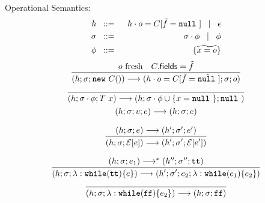 \documentclass[a4paper]{llncs}
\newcommand{\nul}{\ensuremath{\mathtt{null}\ }}
\newcommand{\vdecl}[2]{#1\ #2}
\newcommand{\newo}[1]{\ensuremath{\mathtt{new}\ #1()}}
\newcommand{\while}[2]{\ensuremath{\mathtt{while}(#1)\set{#2}}}
\newcommand{\econtext}[2]{\mathcal{#1}[#2]}
\begin{document}
%
	Operational Semantics:
%
	\begin{eqnarray*}
		h &\bnfis& h \cat o = C[\vect{f} = \vec{\nul}] \bnfbar \epsilon\\
		\sigma &\bnfis& \sigma \cat \phi \bnfbar \phi\\
		\phi &\bnfis& \set{\widetilde{x = o}}
	\end{eqnarray*}
%
\[
	\begin{array}{c}
		\tree{
			o\ \textrm{fresh} \quad C.\mathsf{fields} = \vect{f}
		}{
			(h; \sigma; \newo{C}) \red (h \cat o = C[\vect{f} = \vect{\nul}]; \sigma; o)
		}\\[4mm]
		\tree{
		}{
			(h; \sigma \cat \phi; \vdecl{T}{x}) \red (h; \sigma \cat \phi \cup \set{x = \nul}; \nul)
		}\\[4mm]
			(h; \sigma; v; e) \red (h; \sigma; e)
		\\[4mm]
		\tree{
			(h; \sigma; e) \red (h'; \sigma'; e')
		}{
			(h; \sigma; \econtext{E}{e}) \red (h'; \sigma'; \econtext{E}{e'})
		}
		\\
		\\
		\tree{
			(h; \sigma; e_1) \red^* (h''; \sigma''; \true) %
		}{
			(h; \sigma; \lambda: \while{\true}{e}) \red (h'; \sigma'; e_2;\lambda: \while{e_1}{e_2})
		}\\[4mm]

		\tree{
		}{
			(h; \sigma; \lambda: \while{\false}{e_2}) \red (h; \sigma; \false)
		}
	\end{array}
\]
%



%
\end{document}
